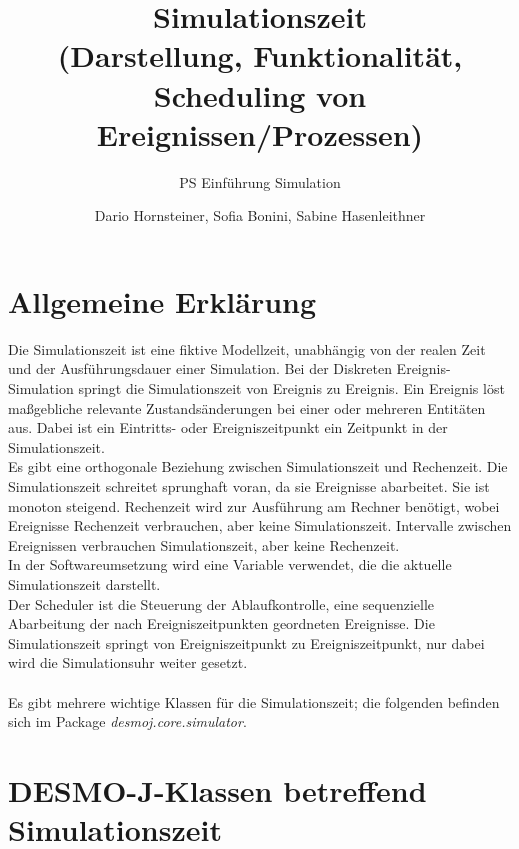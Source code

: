 \documentclass[runningheads]{llncs}
\begin{document}
\title{Simulationszeit \\ (Darstellung, Funktionalität, \\ Scheduling von Ereignissen/Prozessen)}
\subtitle{PS Einführung Simulation}
\author{Dario Hornsteiner, Sofia Bonini, Sabine Hasenleithner}
\maketitle

\section{Allgemeine Erklärung}
Die Simulationszeit ist eine fiktive Modellzeit, unabhängig von der realen Zeit und der Ausführungsdauer einer Simulation. Bei der Diskreten Ereignis-Simulation springt die Simulationszeit von Ereignis zu Ereignis. Ein Ereignis löst maßgebliche relevante Zustandsänderungen bei einer oder mehreren Entitäten aus. Dabei ist ein Eintritts- oder Ereigniszeitpunkt ein Zeitpunkt in der Simulationszeit.\\
Es gibt eine orthogonale Beziehung zwischen Simulationszeit und Rechenzeit. Die Simulationszeit schreitet sprunghaft voran, da sie Ereignisse abarbeitet. Sie ist monoton steigend. Rechenzeit wird zur Ausführung am Rechner benötigt, wobei Ereignisse Rechenzeit verbrauchen, aber keine Simulationszeit. Intervalle zwischen Ereignissen verbrauchen Simulationszeit, aber keine Rechenzeit.\\
In der Softwareumsetzung wird eine Variable verwendet, die die  aktuelle Simulationszeit darstellt. \\
Der Scheduler ist die Steuerung der Ablaufkontrolle, eine sequenzielle Abarbeitung
der nach Ereigniszeitpunkten geordneten Ereignisse. Die Simulationszeit springt von Ereigniszeitpunkt zu Ereigniszeitpunkt, nur dabei wird die Simulationsuhr weiter gesetzt.\\
 \\
Es gibt mehrere wichtige Klassen für die Simulationszeit; die folgenden befinden sich im Package \textit{desmoj.core.simulator}.\\

\section{DESMO-J-Klassen betreffend Simulationszeit}
\end{document}
